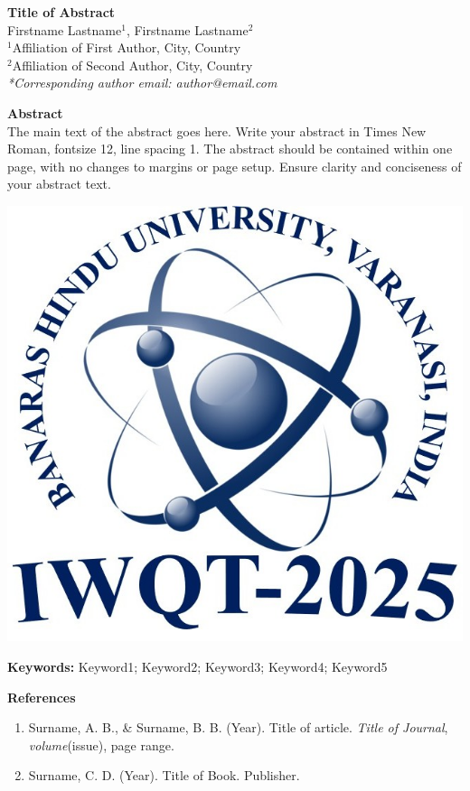 \documentclass[a4paper,12pt]{article}
\begin{document}
\begin{center}
    {\fontsize{14}{16}\selectfont \textbf{Title of Abstract}}\\[10pt]
    
    {\fontsize{10}{12}\selectfont Firstname Lastname$^{1}$, Firstname Lastname$^{2}$}\\[5pt]
    
    {\fontsize{10}{12}\selectfont $^{1}$Affiliation of First Author, City, Country\\
    $^{2}$Affiliation of Second Author, City, Country}\\[5pt]
    
    {\fontsize{10}{12}\selectfont \textit{*Corresponding author email: author@email.com}}\\[15pt]
\end{center}

\noindent
\textbf{Abstract}\\
\noindent
The main text of the abstract goes here. Write your abstract in Times New Roman, fontsize 12, line spacing 1. The abstract should be contained within one page, with no changes to margins or page setup. Ensure clarity and conciseness of your abstract text.

\vspace{10pt}

\begin{center}
    \includegraphics[width=0.5\linewidth]{logo.jpg}  %
\end{center}

\vspace{10pt}

\noindent
\textbf{Keywords:} Keyword1; Keyword2; Keyword3; Keyword4; Keyword5

\vspace{15pt}

\noindent
\textbf{References}
\begin{enumerate}
    \item {\fontsize{10}{12}\selectfont Surname, A. B., \& Surname, B. B. (Year). Title of article. \textit{Title of Journal}, \textit{volume}(issue), page range.}
    \item {\fontsize{10}{12}\selectfont Surname, C. D. (Year). Title of Book. Publisher.}
\end{enumerate}
\end{document}
